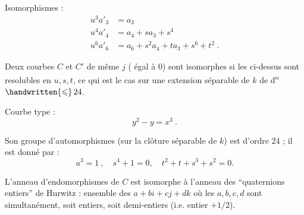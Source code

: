 
Isomorphismes :
\[
\begin{aligned}
 u^{3}a'_{3}&=a_{3}\\
 u^{4}a'_{4}&=a_{4}+sa_{3}+s^{4}\\
 u^{6}a'_{6}&=a_{6}+s^{2}a_{4}+ta_{3}+s^{6}+t^{2}\ .
\end{aligned}
\]

Deux courbes $C$ et $C'$ de même $j$ ( égal à $0$) sont isomorphes si les  ci-dessus sont resolubles en $u,s,t$, ce qui est le cas sur une extension séparable de $k$ de d\textsuperscript{o} $\handwritten{\leqslant}\,24$.

Courbe type :
\[
 y^{2}-y=x^{3}\ .
\]

Son groupe d'automorphismes (sur la clôture séparable de $k$) est d'ordre $24$ ; il est donné par :
\[
 u^{3}=1\ ,\quad s^{4}+1=0,\quad t^{2}+t+s^{3}+s^{2}=0.
\]

L'anneau d'endomorphismes de $C$ est isomorphe à l'anneau des ``quaternions entiers'' de Hurwitz : ensemble des $a+bi+cj+dk$ où les $a,b,c,d$ sont simultanément, soit entiers, soit demi-entiers (i.e. entier $+1/2$).

